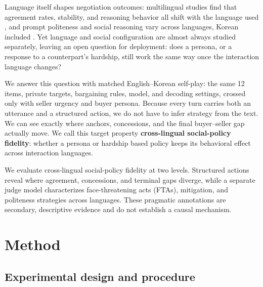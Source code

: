 \documentclass{article}
\begin{document}
Language itself shapes negotiation outcomes: multilingual studies find that
agreement rates, stability, and reasoning behavior all shift with the
language used \citep{sinha2026language,hakimov2026price}, and prompt
politeness and social reasoning vary across languages, Korean included
\citep{yin2024respect,jung2024koreanpoliteness,kim2026socialreasoning}.
Yet language and social configuration are almost always studied separately,
leaving an open question for deployment: does a persona, or a response to a
counterpart's hardship, still work the same way once the interaction
language changes?

We answer this question with matched English--Korean self-play: the same 12
items, private targets, bargaining rules, model, and
decoding settings, crossed only with seller urgency and buyer persona.
Because every turn carries both an utterance and a structured action, we do
not have to infer strategy from the text. We can see exactly where anchors,
concessions, and the final buyer--seller gap actually move. We call this
target property \textbf{cross-lingual social-policy fidelity}: whether a
persona or hardship based policy keeps its behavioral effect across interaction
languages.

We evaluate cross-lingual social-policy fidelity at two levels. Structured
actions reveal where agreement, concessions, and terminal gaps diverge, while
a separate judge model characterizes face-threatening acts (FTAs), mitigation,
and politeness strategies across languages. These pragmatic annotations are secondary, descriptive evidence and do not establish a causal mechanism.

\section{Method}
\label{sec:method}

\subsection{Experimental design and procedure}
\end{document}

